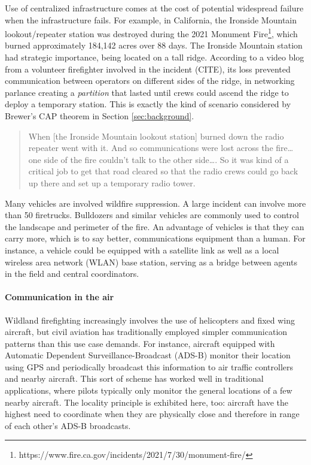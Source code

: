 \documentclass[]             %
{NASA}                       %
\theoremstyle{definition}
\begin{document}
Use of centralized infrastructure comes at the cost of potential
widespread failure when the infrastructure fails. For example, in
California, the Ironside Mountain lookout/repeater station was destroyed
during the 2021 Monument Fire\footnote{https://www.fire.ca.gov/incidents/2021/7/30/monument-fire/},
which burned approximately 184,142 acres over 88 days. The Ironside
Mountain station had strategic importance, being located on a tall
ridge. According to a video blog from a volunteer firefighter involved
in the incident (CITE), its loss prevented communication between
operators on different sides of the ridge, in networking parlance
creating a \emph{partition} that lasted until crews could ascend the
ridge to deploy a temporary station. This is exactly the kind of
scenario considered by Brewer's CAP theorem in Section
\ref{sec:background}.

\begin{quote}
When {[}the Ironside Mountain lookout station{]} burned down the radio
repeater went with it. And so communications were lost across the
fire\ldots{} one side of the fire couldn't talk to the other side\ldots.
So it was kind of a critical job to get that road cleared so that the
radio crews could go back up there and set up a temporary radio tower.
\end{quote}

Many vehicles are involved wildfire suppression. A large incident can
involve more than 50 firetrucks. Bulldozers and similar vehicles are
commonly used to control the landscape and perimeter of the fire. An
advantage of vehicles is that they can carry more, which is to say
better, communications equipment than a human. For instance, a vehicle
could be equipped with a satellite link as well as a local wireless area
network (WLAN) base station, serving as a bridge between agents in the
field and central coordinators.

\paragraph{Communication in the air}

Wildland firefighting increasingly involves the use of helicopters and
fixed wing aircraft, but civil aviation has traditionally employed
simpler communication patterns than this use case demands. For instance,
aircraft equipped with Automatic Dependent Surveillance-Broadcast
(ADS-B) monitor their location using GPS and periodically broadcast this
information to air traffic controllers and nearby aircraft. This sort of
scheme has worked well in traditional applications, where pilots
typically only monitor the general locations of a few nearby aircraft.
The locality principle is exhibited here, too: aircraft have the highest
need to coordinate when they are physically close and therefore in range
of each other's ADS-B broadcasts.
\end{document}
